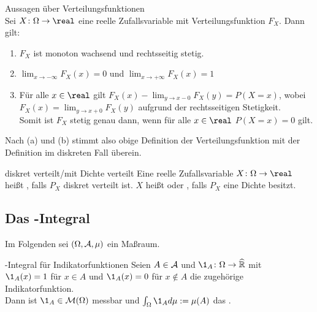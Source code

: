 \begin{Satz}{Aussagen über Verteilungsfunktionen}\\
    Sei $X\colon \Omega \rightarrow \real$ eine reelle Zufallsvariable mit Verteilungsfunktion
    $F_X$.
    Dann gilt:
    \begin{enumerate}
        \item
        $F_X$ ist monoton wachsend und rechtsseitig stetig.

        \item
        $\lim_{x \to -\infty} F_X(x) = 0$ und
        $\lim_{x \to +\infty} F_X(x) = 1$

        \item
        Für alle $x \in \real$ gilt $F_X(x) - \lim_{y \to x-0} F_X(y) = P(X = x)$,
        wobei $F_X(x) = \lim_{y \to x+0} F_X(y)$ aufgrund der rechtsseitigen Stetigkeit.\\
        Somit ist $F_X$ stetig genau dann, wenn für alle $x \in \real$ $P(X = x) = 0$ gilt.
    \end{enumerate}
\end{Satz}

\begin{Bem}
    Nach (a) und (b) stimmt also obige Definition der Verteilungsfunktion mit der
    Definition im diskreten Fall überein.
\end{Bem}

\begin{Def}{diskret verteilt/mit Dichte verteilt}
    Eine reelle Zufallsvariable $X\colon \Omega \rightarrow \real$ heißt
    , falls $P_X$ diskret verteilt ist.
    $X$ heißt  oder ,
    falls $P_X$ eine Dichte besitzt.
\end{Def}

\pagebreak

\subsection{%
    Das -Integral%
}

\begin{Bem}
    Im Folgenden sei $(\Omega, \mathcal{A}, \mu)$ ein Maßraum.
\end{Bem}

\begin{Def}{-Integral für Indikatorfunktionen}
    Seien $A \in \mathcal{A}$ und $\1_A\colon \Omega \rightarrow \extreal$ mit\\
    $\1_A(x) = 1$ für $x \in A$ und $\1_A(x) = 0$ für $x \notin A$
    die zugehörige Indikatorfunktion.\\
    Dann ist $\1_A \in \M(\Omega)$ messbar und
    $\int_\Omega \1_A d\mu := \mu(A)$ das .
\end{Def}

